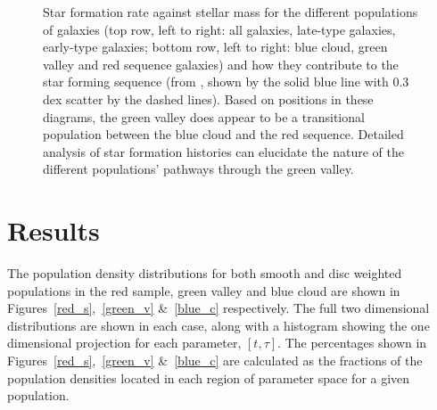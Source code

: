 \begin{figure}
\caption[SFR-stellar mass plane split by morphology and colour]{Star formation rate against stellar mass for the different populations of galaxies (top row, left to right: all galaxies, late-type galaxies, early-type galaxies; bottom row, left to right: blue cloud, green valley and red sequence galaxies) and how they contribute to the star forming sequence (from \citet{peng10}, shown by the solid blue line with 0.3 dex scatter by the dashed lines). Based on positions in these diagrams, the green valley does appear to be a transitional population between the blue cloud and the red sequence. Detailed analysis of star formation histories can elucidate the nature of the different populations' pathways through the green valley.}
\label{sfr_mass_sub}
\end{figure}


\section{Results}\label{sec:morphresults}

The population density distributions for both smooth and disc weighted populations in the red sample, green valley and blue cloud are shown in Figures~\ref{red_s},~\ref{green_v} \&~\ref{blue_c} respectively. The full two dimensional distributions are shown in each case, along with a histogram showing the one dimensional projection for each parameter, $[t, \tau]$. The percentages shown in Figures~\ref{red_s},~\ref{green_v} \&~\ref{blue_c} are calculated as the fractions of the population densities located in each region of parameter space for a given population. 


